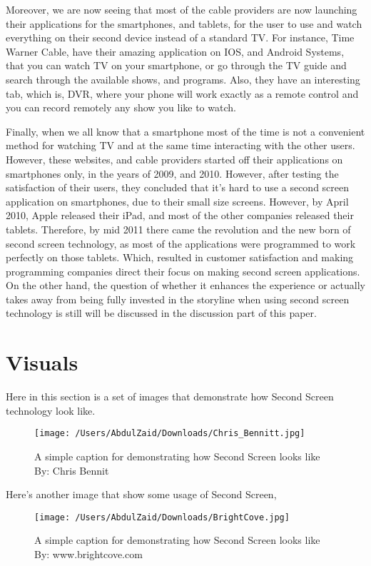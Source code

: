 \documentclass[12pt, oneside]{amsart}   	%
\begin{document}
Moreover, we are now seeing that most of the cable providers are now launching their applications for the smartphones, and tablets, for the user to use and watch everything on their second device instead of a standard TV.  For instance, Time Warner Cable, have their amazing application on IOS, and Android Systems, that you can watch TV on your smartphone, or go through the TV guide and search through the available shows, and programs.  Also, they have an interesting tab, which is, DVR, where your phone will work exactly as a remote control and you can record remotely any show you like to watch.  

 Finally, when we all know that a smartphone most of the time is not a convenient method for watching TV and at the same time interacting with the other users.  However, these websites, and cable providers started off their applications on smartphones only, in the years of 2009, and 2010.  However, after testing the satisfaction of their users, they concluded that it's hard to use a second screen application on smartphones, due to their small size screens.  However, by April 2010, Apple released their iPad, and most of the other companies released their tablets.  Therefore, by mid 2011 there came the revolution and the new born of second screen technology, as most of the applications were programmed to work perfectly on those tablets.  Which, resulted in customer satisfaction and making programming companies direct their focus on making second screen applications.  On the other hand, the question of whether it enhances the experience or actually takes away from being fully invested in the storyline when using second screen technology is still will be discussed in the discussion part of this paper.
 \section{Visuals} 
Here in this section is a set of images that demonstrate how Second Screen technology look like.
\begin{figure}[ht!]
\centering
\texttt{[image: /Users/AbdulZaid/Downloads/Chris\_Bennitt.jpg]}
\caption{A simple caption for demonstrating how Second Screen looks like By: Chris Bennit}
\label{overflow}
\end{figure}

Here's another image that show some usage of Second Screen,
\begin{figure}[ht!]
\centering
\texttt{[image: /Users/AbdulZaid/Downloads/BrightCove.jpg]}
\caption{A simple caption for demonstrating how Second Screen looks like By: www.brightcove.com}
\label{overflow}
\end{figure}
\end{document}
